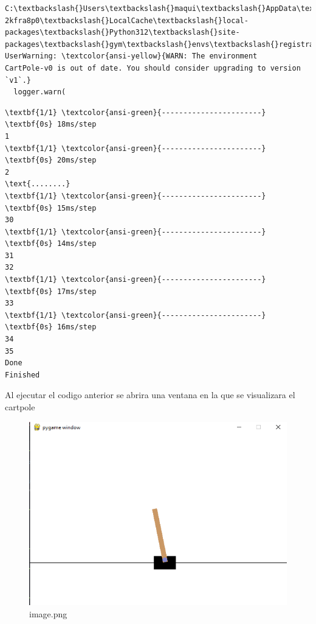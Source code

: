 \documentclass[11pt]{article}
\begin{document}
\begin{tcolorbox}[breakable, size=fbox, boxrule=1pt, pad at break*=1mm,colback=cellbackground, colframe=cellborder]
    \begin{Verbatim}[commandchars=\\\{\}]
C:\textbackslash{}Users\textbackslash{}maqui\textbackslash{}AppData\textbackslash{}Local\textbackslash{}Packages\textbackslash{}PythonSoftwareFoundation.Python.3.12\_qbz5n
2kfra8p0\textbackslash{}LocalCache\textbackslash{}local-packages\textbackslash{}Python312\textbackslash{}site-
packages\textbackslash{}gym\textbackslash{}envs\textbackslash{}registration.py:555: UserWarning: \textcolor{ansi-yellow}{WARN: The environment
CartPole-v0 is out of date. You should consider upgrading to version `v1`.}
  logger.warn(
    \end{Verbatim}

    \begin{Verbatim}[commandchars=\\\{\}]
\textbf{1/1} \textcolor{ansi-green}{-----------------------} \textbf{0s} 18ms/step
1
\textbf{1/1} \textcolor{ansi-green}{-----------------------} \textbf{0s} 20ms/step
2
\text{........}
\textbf{1/1} \textcolor{ansi-green}{-----------------------} \textbf{0s} 15ms/step
30
\textbf{1/1} \textcolor{ansi-green}{-----------------------} \textbf{0s} 14ms/step
31
32
\textbf{1/1} \textcolor{ansi-green}{-----------------------} \textbf{0s} 17ms/step
33
\textbf{1/1} \textcolor{ansi-green}{-----------------------} \textbf{0s} 16ms/step
34
35
Done
Finished
    \end{Verbatim}
\end{tcolorbox}

Al ejecutar el codigo anterior se abrira una ventana en la que se
visualizara el cartpole

\begin{figure}
\centering
\includegraphics{cartpole_files/image.png}
\caption{image.png}
\end{figure}
\end{document}
